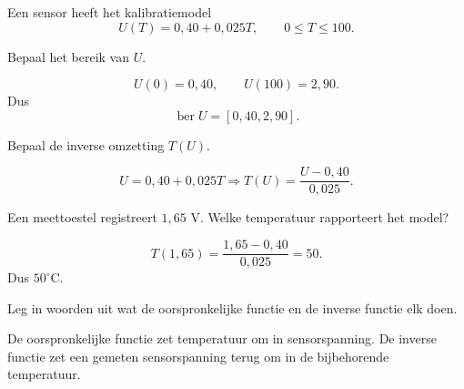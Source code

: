 \documentclass{ximera}
\begin{document}
\begin{oefening}{\oefU\ESS}

Een sensor heeft het kalibratiemodel
\[
U(T)=0{,}40+0{,}025T,
\qquad 0\leq T\leq100.
\]

\begin{question}
Bepaal het bereik van \(U\).

\begin{oplossing}
\[
U(0)=0{,}40,\qquad U(100)=2{,}90.
\]
Dus
\[
\operatorname{ber}U=[0{,}40,2{,}90].
\]
\end{oplossing}
\end{question}

\begin{question}
Bepaal de inverse omzetting \(T(U)\).

\begin{oplossing}
\[
U=0{,}40+0{,}025T
\Longrightarrow
\boxed{T(U)=\frac{U-0{,}40}{0{,}025}.}
\]
\end{oplossing}
\end{question}

\begin{question}
Een meettoestel registreert \(1{,}65\) V. Welke temperatuur rapporteert het model?

\begin{oplossing}
\[
T(1{,}65)=\frac{1{,}65-0{,}40}{0{,}025}=50.
\]
Dus \(50^\circ\mathrm C\).
\end{oplossing}
\end{question}

\begin{question}
Leg in woorden uit wat de oorspronkelijke functie en de inverse functie
elk doen.

\begin{oplossing}
De oorspronkelijke functie zet temperatuur om in sensorspanning.
De inverse functie zet een gemeten sensorspanning terug om in de
bijbehorende temperatuur.
\end{oplossing}
\end{question}

\end{oefening}
\end{document}

